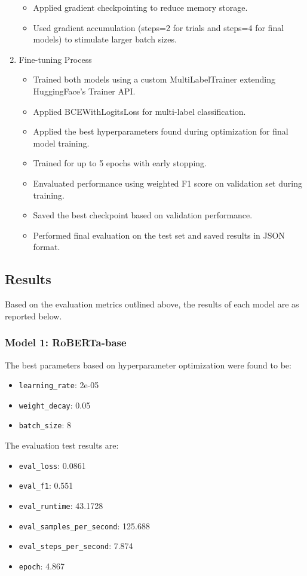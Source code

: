 \documentclass[titlepage]{article}
\begin{document}
\begin{enumerate}
\begin{itemize}
            \item Applied gradient checkpointing to reduce memory storage.
            \item Used gradient accumulation (steps=2 for trials and steps=4 for final models) to stimulate larger batch sizes.
        \end{itemize}
    \item Fine-tuning Process 
        \begin{itemize}
            \item Trained both models using a custom MultiLabelTrainer extending HuggingFace's Trainer API.
            \item Applied BCEWithLogitsLoss for multi-label classification.
            \item Applied the best hyperparameters found during optimization for final model training.
            \item Trained for up to 5 epochs with early stopping.
            \item Envaluated performance using weighted F1 score on validation set during training.
            \item Saved the best checkpoint based on validation performance.
            \item Performed final evaluation on the test set and saved results in JSON format.
        \end{itemize}
\end{enumerate}

\subsection{Results}
Based on the evaluation metrics outlined above, the results of each model are as reported below.

\subsubsection{Model 1: RoBERTa-base}
The best parameters based on hyperparameter optimization were found to be:
\begin{itemize}
    \item \texttt{learning\_rate}: 2e-05
    \item \texttt{weight\_decay}: 0.05
    \item \texttt{batch\_size}: 8
\end{itemize}

The evaluation test results are:
\begin{itemize}
    \item \texttt{eval\_loss}: 0.0861
    \item \texttt{eval\_f1}: 0.551
    \item \texttt{eval\_runtime}: 43.1728
    \item \texttt{eval\_samples\_per\_second}: 125.688
    \item \texttt{eval\_steps\_per\_second}: 7.874
    \item \texttt{epoch}: 4.867
\end{itemize}
\end{document}
